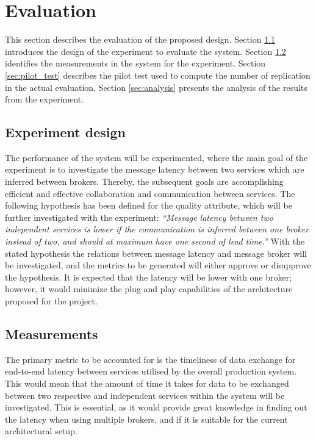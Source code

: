 \section{Evaluation}
\label{sec:evaluation}
This section describes the evaluation of the proposed design.
Section \ref{sec:design} introduces the design of the experiment to evaluate the system. 
Section \ref{sec:measurements} identifies the measurements in the system for the experiment.
Section \ref{sec:pilot_test} describes the pilot test used to compute the number of replication in the actual evaluation. 
Section \ref{sec:analysis} presents the analysis of the results from the experiment. 


\subsection{Experiment design}
\label{sec:design}
The performance of the system will be experimented, where the main goal of the experiment is to investigate the message latency between two services which are inferred between brokers. Thereby, the subsequent goals are accomplishing efficient and effective collaboration and communication between services.
The following hypothesis has been defined for the quality attribute, which will be further investigated with the experiment:
\textit{“Message latency between two independent services is lower if the communication is inferred between one broker instead of two, and should at maximum have one second of lead time.”}
With the stated hypothesis the relations between message latency and message broker will be investigated, and the metrics to be generated will either approve or disapprove the hypothesis. It is expected that the latency will be lower with one broker; however, it would minimize the plug and play capabilities of the architecture proposed for the project.

\subsection{Measurements}
\label{sec:measurements}
The primary metric to be accounted for is the timeliness of data exchange for end-to-end latency between services utilised by the overall production system. This would mean that the amount of time it takes for data to be exchanged between two respective and independent services within the system will be investigated. This is essential, as it would provide great knowledge in finding out the latency when using multiple brokers, and if it is suitable for the current architectural setup. 
